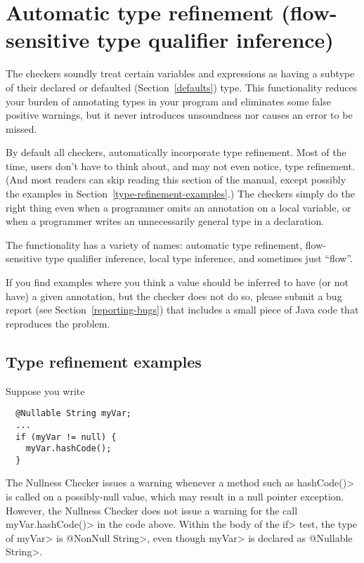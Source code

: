 \section{Automatic type refinement (flow-sensitive type qualifier inference)\label{type-refinement}}

The
checkers soundly treat certain variables and expressions as having a
subtype of their declared or defaulted (Section~\ref{defaults})
type.
This functionality
reduces your burden of annotating types in your program and
eliminates some false positive warnings, but it
never introduces unsoundness nor causes an error to be missed.

By default all checkers, 
automatically incorporate type refinement.  Most of the time, users don't
have to think about, and may not even notice, type refinement.
(And most readers can skip reading this section of the manual, except
possibly the examples in Section~\ref{type-refinement-examples}.)
The
checkers simply do the right thing even when a programmer omits an
annotation on a local variable, or when a programmer writes an
unnecessarily general type in a declaration.

The functionality has a variety of names:  automatic type refinement,
flow-sensitive type qualifier inference, local type inference, and
sometimes just ``flow''.

If you find examples where you think a value should be inferred to have
(or not have) a
given annotation, but the checker does not do so, please submit a bug
report (see Section~\ref{reporting-bugs}) that includes a small piece of
Java code that reproduces the problem.


\subsection{Type refinement examples\label{type-refinement-examples}}

Suppose you write

\begin{Verbatim}
  @Nullable String myVar;
  ...
  if (myVar != null) {
    myVar.hashCode();
  }
\end{Verbatim}

\noindent
The Nullness Checker issues a warning whenever a method such as
\<hashCode()> is called on a possibly-null value, which  may result in a
null pointer exception.
However, the Nullness Checker does not issue a warning for the call
\<myVar.hashCode()>
in the code above.
Within the body
of the \<if> test, the type of \<myVar> is \<@NonNull String>, even though
\<myVar> is declared as \<@Nullable String>.

